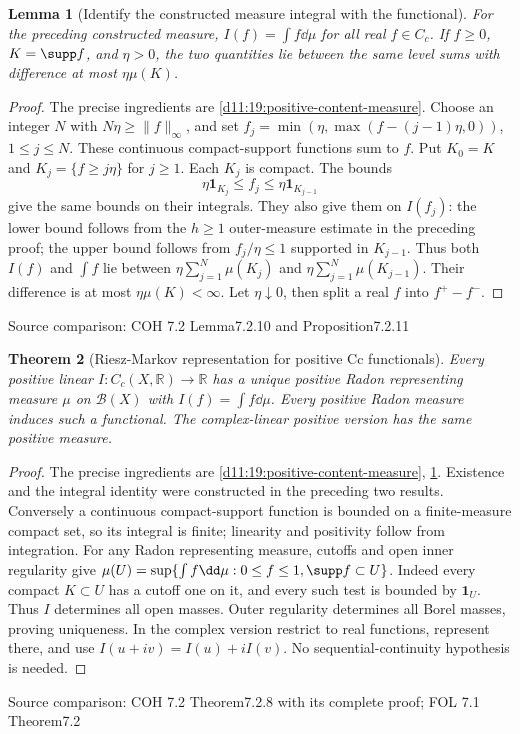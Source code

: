 \documentclass[11pt,oneside,openany]{book}
\newtheorem{theorem}{Theorem}[chapter]
\newtheorem{lemma}[theorem]{Lemma}
\theoremstyle{definition}
\theoremstyle{remark}
\newcommand{\R}{\mathbb R}\newcommand{\C}{\mathbb C}
\newcommand{\BB}{\mathcal B}\newcommand{\SSS}{\mathcal S}
\newcommand{\one}{\mathbf1}\newcommand{\ind}[1]{\mathbf1_{#1}}
\newcommand{\family}[1]{}
\newcommand{\source}[1]{\par\begingroup\small\sffamily\color{black!65}Source comparison: #1\par\endgroup}
\begin{document}
\begin{lemma}[Identify the constructed measure integral with the functional]\family{D11.19.positive_content_integral}\label{d11:19:positive-content-integral}
For the preceding constructed measure, $I(f)=\int f\dd\mu$ for all real $f\in C_c$. If $f\ge0$, $K=\supp f$, and $\eta>0$, the two quantities lie between the same level sums with difference at most $\eta\mu(K)$.
\end{lemma}
\begin{proof}
The precise ingredients are \cref{d11:19:positive-content-measure}. Choose an integer $N$ with $N\eta\ge\|f\|_\infty$, and set $f_j=\min(\eta,\max(f-(j-1)\eta,0))$, $1\le j\le N$. These continuous compact-support functions sum to $f$. Put $K_0=K$ and $K_j=\{f\ge j\eta\}$ for $j\ge1$. Each $K_j$ is compact. The bounds
\[\eta\one_{K_j}\le f_j\le\eta\one_{K_{j-1}}\]
give the same bounds on their integrals. They also give them on $I(f_j)$: the lower bound follows from the $h\ge1$ outer-measure estimate in the preceding proof; the upper bound follows from $f_j/\eta\le1$ supported in $K_{j-1}$. Thus both $I(f)$ and $\int f$ lie between $\eta\sum_{j=1}^N\mu(K_j)$ and $\eta\sum_{j=1}^N\mu(K_{j-1})$. Their difference is at most $\eta\mu(K)<\infty$. Let $\eta\downarrow0$, then split a real $f$ into $f^+-f^-$.
\end{proof}
\source{COH 7.2 Lemma7.2.10 and Proposition7.2.11}

\begin{theorem}[Riesz-Markov representation for positive Cc functionals]\family{D11.19.positive_riesz_markov}\label{d11:19:positive-riesz-markov}
Every positive linear $I:C_c(X,\R)\to\R$ has a unique positive Radon representing measure $\mu$ on $\BB(X)$ with $I(f)=\int f\dd\mu$. Every positive Radon measure induces such a functional. The complex-linear positive version has the same positive measure.
\end{theorem}
\begin{proof}
The precise ingredients are \cref{d11:19:positive-content-measure}, \cref{d11:19:positive-content-integral}. Existence and the integral identity were constructed in the preceding two results. Conversely a continuous compact-support function is bounded on a finite-measure compact set, so its integral is finite; linearity and positivity follow from integration. For any Radon representing measure, cutoffs and open inner regularity give
$\mu(U)=\sup\{\int f\dd\mu:0\le f\le1,\supp f\subset U\}$.
Indeed every compact $K\subset U$ has a cutoff one on it, and every such test is bounded by $\one_U$. Thus $I$ determines all open masses. Outer regularity determines all Borel masses, proving uniqueness. In the complex version restrict to real functions, represent there, and use $I(u+iv)=I(u)+iI(v)$. No sequential-continuity hypothesis is needed.
\end{proof}
\source{COH 7.2 Theorem7.2.8 with its complete proof; FOL 7.1 Theorem7.2}
\end{document}
